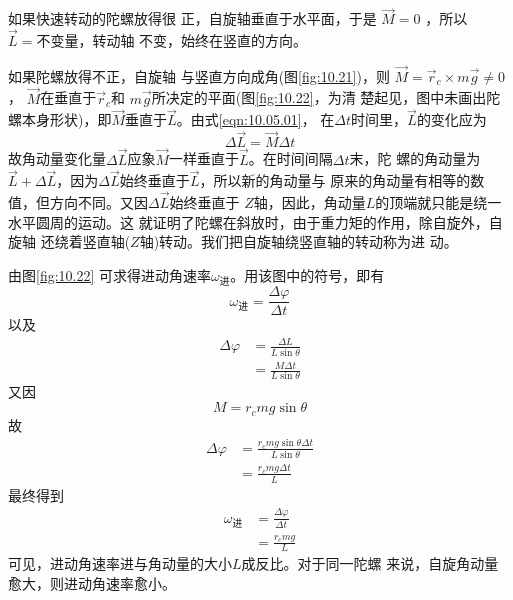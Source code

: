 如果快速转动的陀螺放得很
正，自旋轴垂直于水平面，于是
$ \vec{M} = 0 $  ，所以$ \vec{L} = \text{不变量} $，转动轴
不变，始终在竖直的方向。

如果陀螺放得不正，自旋轴
与竖直方向成角(图\ref{fig:10.21})，则
$ \vec{M} = \vec{r} _ { c } \times m \vec{g} \ne 0 $， $ \vec{M} $在垂直于$ \vec{r} _ c $和
$ m\vec{g} $所决定的平面(图\ref{fig:10.22}，为清
楚起见，图中未画出陀螺本身形状)，即$ \vec{M} $垂直于$\vec{L}$。由式\eqref{eqn:10.05.01}，
在$ \Delta t $时间里，$\vec{L}$的变化应为
\begin{equation*}
    \Delta \vec{L} = \vec{M} \Delta t
\end{equation*}
故角动量变化量$ \Delta \vec{L} $应象$\vec{M}$一样垂直于$\vec{L}$。在时间间隔$ \Delta t $末，陀
螺的角动量为$ \vec{L} + \Delta \vec{L} $，因为$ \Delta \vec{L} $始终垂直于$\vec{L}$，所以新的角动量与
原来的角动量有相等的数值，但方向不同。又因$ \Delta \vec{L} $始终垂直于
$ Z $轴，因此，角动量$ L $的顶端就只能是绕一水平圆周的运动。这
就证明了陀螺在斜放时，由于重力矩的作用，除自旋外，自旋轴
还绕着竖直轴($ Z $轴)转动。我们把自旋轴绕竖直轴的转动称为进
动。

由图\ref{fig:10.22} 可求得进动角速率$ \omega _ \text{进} $。用该图中的符号，即有
\begin{equation*}
    \omega _ \text{进} = \frac { \Delta \varphi } { \Delta t }
\end{equation*}
以及\vspace{-1.56em}
\begin{equation*}
    \begin{split}
        \Delta \varphi &= \frac { \Delta L } { L \sin \theta } \\
            &= \frac { M \Delta t } { L \sin \theta }
    \end{split}
\end{equation*}
又因\vspace{-1.56em}
\begin{equation*}
    M = r _ { c } m g \sin \theta
\end{equation*}
故\vspace{-1.56em}
\begin{equation*}
    \begin{split}
        \Delta \varphi &= \frac { r _ { c } m g \sin \theta \Delta t } { L \sin \theta } \\
            &= \frac { r _ { c } m g \Delta t } { L }
    \end{split}
\end{equation*}
最终得到\vspace{-1.56em}
\begin{equation}\label{eqn:10.05.02}
    \begin{split}
        \omega _ \text{进} &= \frac { \Delta \varphi } { \Delta t } \\
                &= \frac { r _ { c } m g } { L }
    \end{split}
\end{equation}
可见，进动角速率进与角动量的大小$ L $成反比。对于同一陀螺
来说，自旋角动量愈大，则进动角速率愈小。

